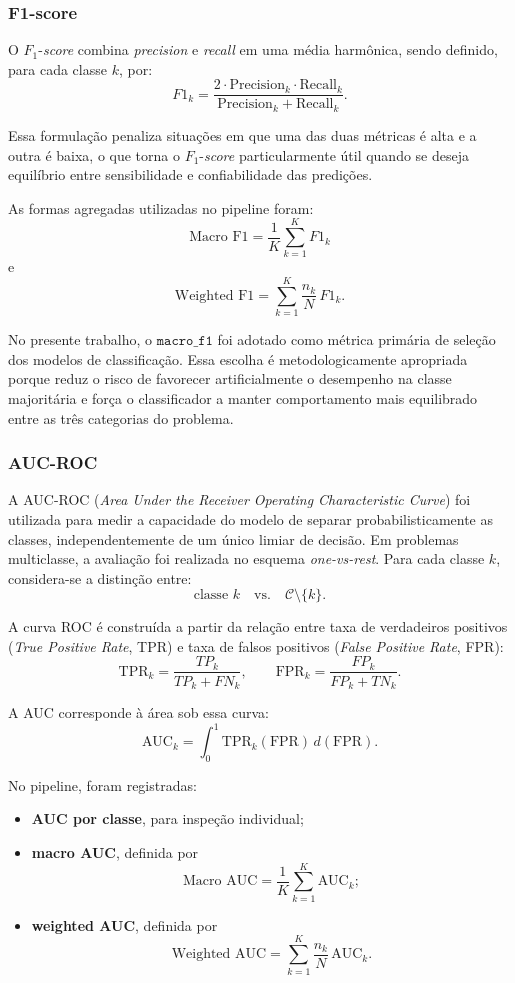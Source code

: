 \documentclass[tcc,capa]{texufpel}
\begin{document}
\subsubsection{F1-score}

O \(F_1\)-\textit{score} combina \textit{precision} e \textit{recall} em uma média harmônica, sendo definido, para cada classe \(k\), por:
\[
F1_k
=
\frac{2 \cdot \text{Precision}_k \cdot \text{Recall}_k}
{\text{Precision}_k + \text{Recall}_k}.
\]

Essa formulação penaliza situações em que uma das duas métricas é alta e a outra é baixa, o que torna o \(F_1\)-\textit{score} particularmente útil quando se deseja equilíbrio entre sensibilidade e confiabilidade das predições.

As formas agregadas utilizadas no pipeline foram:
\[
\text{Macro F1}
=
\frac{1}{K}\sum_{k=1}^{K} F1_k
\]
e
\[
\text{Weighted F1}
=
\sum_{k=1}^{K}\frac{n_k}{N}\,F1_k.
\]

No presente trabalho, o \(\texttt{macro\_f1}\) foi adotado como métrica primária de seleção dos modelos de classificação. Essa escolha é metodologicamente apropriada porque reduz o risco de favorecer artificialmente o desempenho na classe majoritária e força o classificador a manter comportamento mais equilibrado entre as três categorias do problema.

\subsubsection{AUC-ROC}

A AUC-ROC (\textit{Area Under the Receiver Operating Characteristic Curve}) foi utilizada para medir a capacidade do modelo de separar probabilisticamente as classes, independentemente de um único limiar de decisão. Em problemas multiclasse, a avaliação foi realizada no esquema \textit{one-vs-rest}. Para cada classe \(k\), considera-se a distinção entre:
\[
\text{classe } k
\quad \text{vs.} \quad
\mathcal{C}\setminus\{k\}.
\]

A curva ROC é construída a partir da relação entre taxa de verdadeiros positivos (\textit{True Positive Rate}, TPR) e taxa de falsos positivos (\textit{False Positive Rate}, FPR):
\[
\text{TPR}_k
=
\frac{TP_k}{TP_k + FN_k},
\qquad
\text{FPR}_k
=
\frac{FP_k}{FP_k + TN_k}.
\]

A AUC corresponde à área sob essa curva:
\[
\text{AUC}_k
=
\int_0^1 \text{TPR}_k(\text{FPR}) \, d(\text{FPR}).
\]

No pipeline, foram registradas:
\begin{itemize}
	\item \textbf{AUC por classe}, para inspeção individual;
	\item \textbf{macro AUC}, definida por
	\[
	\text{Macro AUC}
	=
	\frac{1}{K}\sum_{k=1}^{K}\text{AUC}_k;
	\]
	\item \textbf{weighted AUC}, definida por
	\[
	\text{Weighted AUC}
	=
	\sum_{k=1}^{K}\frac{n_k}{N}\,\text{AUC}_k.
	\]
\end{itemize}
\end{document}
